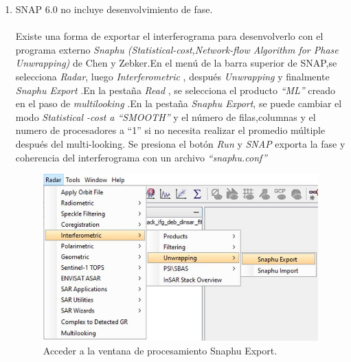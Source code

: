 \documentclass{article}
\begin{document}
\begin{enumerate}
	\item SNAP 6.0 no incluye desenvolvimiento de fase.\\ \\ Existe una forma de exportar el interferograma para desenvolverlo con el programa externo \textit{Snaphu (Statistical-cost,Network-flow Algorithm for Phase Unwrapping)} de Chen y Zebker.En el menú de la barra superior de SNAP,se selecciona \textit{Radar}, luego \textit{Interferometric} , después \textit{Unwrapping}  y finalmente \textit{Snaphu Export} .En la pestaña \textit{Read} , se selecciona el
producto \textit{“ML”} creado en el paso de \textit{multilooking} .En la pestaña \textit{Snaphu Export}, se puede cambiar el modo \textit{Statistical
-cost a “SMOOTH”} y el número de filas,columnas  y el numero de procesadores a “1” si no necesita realizar el promedio múltiple después del multi-looking. Se presiona  el botón \textit{Run}  y \textit{SNAP}  exporta la fase y coherencia del interferograma con un archivo \textit{“snaphu.conf”} 
\begin{figure}[htbp]
\begin{minipage}[b]{0.6\linewidth}
\centering
\includegraphics[width=\linewidth]{Imagen/22.JPG}
\caption{Acceder a la ventana de procesamiento Snaphu Export.}
\label{fig:figura22}
\end{minipage}
\hspace{0.5cm}
\begin{minipage}[b]{0.5\linewidth}
\centering

\end{minipage}
\end{figure}
\end{enumerate}
\end{document}
